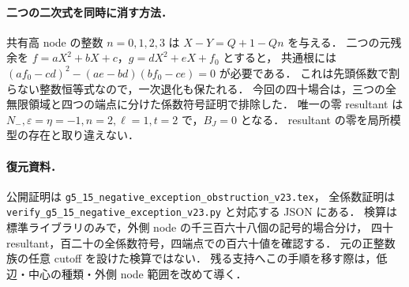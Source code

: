 \paragraph{二つの二次式を同時に消す方法．}
共有高 node の整数 $n=0,1,2,3$ は $X-Y=Q+1-Qn$ を与える．
二つの元残余を $f=aX^2+bX+c$，$g=dX^2+eX+f_0$ とすると，
共通根には $(af_0-cd)^2-(ae-bd)(bf_0-ce)=0$ が必要である．
これは先頭係数で割らない整数恒等式なので，一次退化も保たれる．
今回の四十場合は，三つの全無限領域と四つの端点に分けた係数符号証明で排除した．
唯一の零 resultant は $N_-,\varepsilon=\eta=-1,n=2,\ell=1,t=2$ で，$B_J=0$ となる．
resultant の零を局所模型の存在と取り違えない．

\paragraph{復元資料．}
公開証明は \nolinkurl{g5_15_negative_exception_obstruction_v23.tex}，
全係数証明は \nolinkurl{verify_g5_15_negative_exception_v23.py} と対応する JSON にある．
検算は標準ライブラリのみで，外側 node の千三百六十八個の記号的場合分け，
四十 resultant，百二十の全係数符号，四端点での百六十値を確認する．
元の正整数族の任意 cutoff を設けた検算ではない．
残る支持へこの手順を移す際は，低辺・中心の種類・外側 node 範囲を改めて導く．
